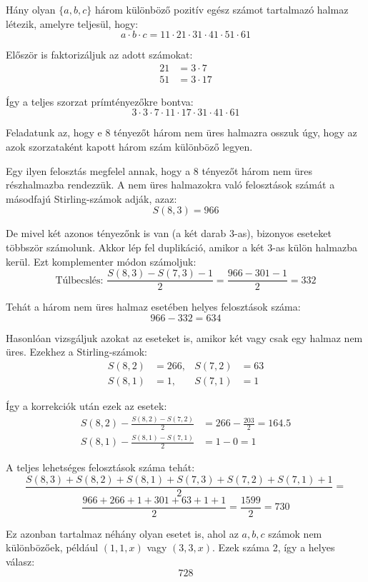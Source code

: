 \begin{extraproblem}
Hány olyan $\{a,b,c\}$ három különböző pozitív egész számot tartalmazó
halmaz létezik, amelyre teljesül, hogy: 
\[
a\cdot b\cdot c=11\cdot21\cdot31\cdot41\cdot51\cdot61
\]
\end{extraproblem}

\begin{solution}
Először is faktorizáljuk az adott számokat: 
\begin{align*}
21 & =3\cdot7\\
51 & =3\cdot17
\end{align*}

Így a teljes szorzat prímtényezőkre bontva: 
\[
3\cdot3\cdot7\cdot11\cdot17\cdot31\cdot41\cdot61
\]

Feladatunk az, hogy e 8 tényezőt három nem üres halmazra osszuk úgy,
hogy az azok szorzataként kapott három szám különböző legyen.

Egy ilyen felosztás megfelel annak, hogy a 8 tényezőt három nem üres
részhalmazba rendezzük. A nem üres halmazokra való felosztások számát
a másodfajú Stirling-számok adják, azaz: 
\[
S(8,3)=966
\]

De mivel két azonos tényezőnk is van (a két darab 3-as), bizonyos
eseteket többször számolunk. Akkor lép fel duplikáció, amikor a két
3-as külön halmazba kerül. Ezt komplementer módon számoljuk: 
\[
\text{Túlbecslés: }\frac{S(8,3)-S(7,3)-1}{2}=\frac{966-301-1}{2}=332
\]

Tehát a három nem üres halmaz esetében helyes felosztások száma: 
\[
966-332=634
\]

Hasonlóan vizsgáljuk azokat az eseteket is, amikor két vagy csak egy
halmaz nem üres. Ezekhez a Stirling-számok: 
\begin{align*}
S(8,2) & =266, & S(7,2) & =63\\
S(8,1) & =1, & S(7,1) & =1
\end{align*}

Így a korrekciók után ezek az esetek: 
\begin{align*}
S(8,2)-\frac{S(8,2)-S(7,2)}{2} & =266-\frac{203}{2}=164.5\\
S(8,1)-\frac{S(8,1)-S(7,1)}{2} & =1-0=1
\end{align*}

A teljes lehetséges felosztások száma tehát: 
\[
\frac{S(8,3)+S(8,2)+S(8,1)+S(7,3)+S(7,2)+S(7,1)+1}{2}=
\]
\[
\frac{966+266+1+301+63+1+1}{2}=\frac{1599}{2}=730
\]

Ez azonban tartalmaz néhány olyan esetet is, ahol az $a,b,c$ számok
nem különbözőek, például $(1,1,x)$ vagy $(3,3,x)$. Ezek száma 2,
így a helyes válasz: 
\[
\boxed{728}
\]
\end{solution}

